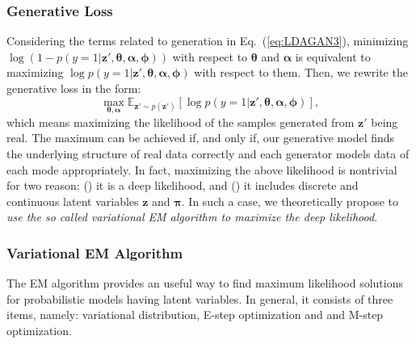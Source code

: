 \documentclass{article}
\begin{document}
\subsubsection{Generative Loss}
\label{sec:GeLoss}

Considering the terms related to generation in Eq.~(\ref{eq:LDAGAN3}), minimizing $\log\left(1-p\left(y=1|\mathbf{z}',\bm{\theta},\bm{\alpha}, \bm{\phi}\right)\right)$ with respect to $\bm{\theta}$ and $\bm{\alpha}$ is equivalent to maximizing $\log p\left(y=1|\mathbf{z}',\bm{\theta},\bm{\alpha}, \bm{\phi}\right)$ with respect to them.
Then, we rewrite the generative loss in the form:
\begin{equation}
\max_{\bm{\theta},\bm{\alpha}}
\mathbb{E}_{\mathbf{z}' \sim p \left( \mathbf{z}' \right)}
\left[ \log p\left( y=1 | \mathbf{z}',\bm{\theta},\bm{\alpha}, \bm{\phi} \right) \right],
\label{eq:Learning-G1}
\end{equation}
which means maximizing the likelihood of the samples generated from $\mathbf{z}'$ being real.
The maximum can be achieved if, and only if, our generative model finds the underlying structure of real data correctly and each generator models data of each mode appropriately.
In fact, maximizing the above likelihood is nontrivial for two reason:
() it is a deep likelihood, and
() it includes discrete and continuous latent variables $\mathbf{z}$ and $\bm{\pi}$.
In such a case, we theoretically propose to \emph{use the so called variational EM algorithm to maximize the deep likelihood}.



\subsubsection{Variational EM Algorithm}
\label{sec:EM}

The EM algorithm provides an useful way to find maximum likelihood solutions for probabilistic models having latent variables.
In general, it consists of three items, namely: variational distribution, E-step optimization and and M-step optimization.
\end{document}
